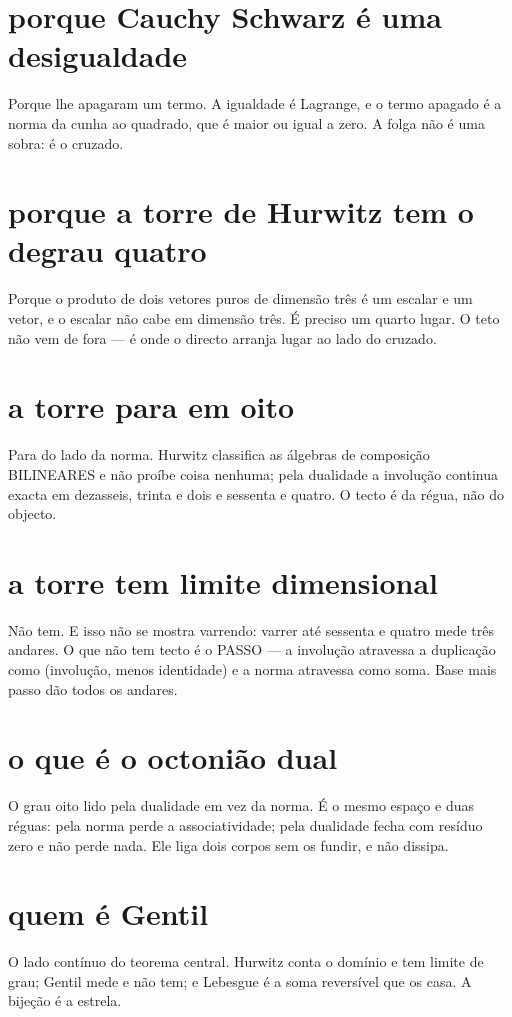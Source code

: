 \documentclass[11pt,a4paper]{article}
\begin{document}
\section{porque Cauchy Schwarz é uma desigualdade}
Porque lhe apagaram um termo. A igualdade é Lagrange, e o termo apagado é a norma da
cunha ao quadrado, que é maior ou igual a zero. A folga não é uma sobra: é o cruzado.

\section{porque a torre de Hurwitz tem o degrau quatro}
Porque o produto de dois vetores puros de dimensão três é um escalar e um vetor, e o
escalar não cabe em dimensão três. É preciso um quarto lugar. O teto não vem de fora ---
é onde o directo arranja lugar ao lado do cruzado.

\section{a torre para em oito}
Para do lado da norma. Hurwitz classifica as álgebras de composição BILINEARES e não
proíbe coisa nenhuma; pela dualidade a involução continua exacta em dezasseis, trinta e
dois e sessenta e quatro. O tecto é da régua, não do objecto.

\section{a torre tem limite dimensional}
Não tem. E isso não se mostra varrendo: varrer até sessenta e quatro mede três andares.
O que não tem tecto é o PASSO — a involução atravessa a duplicação como (involução,
menos identidade) e a norma atravessa como soma. Base mais passo dão todos os andares.

\section{o que é o octonião dual}
O grau oito lido pela dualidade em vez da norma. É o mesmo espaço e duas réguas: pela
norma perde a associatividade; pela dualidade fecha com resíduo zero e não perde nada.
Ele liga dois corpos sem os fundir, e não dissipa.

\section{quem é Gentil}
O lado contínuo do teorema central. Hurwitz conta o domínio e tem limite de grau; Gentil
mede e não tem; e Lebesgue é a soma reversível que os casa. A bijeção é a estrela.
\end{document}
